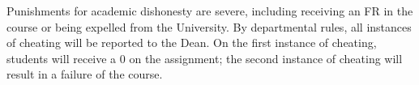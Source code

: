 \documentclass{article}
\begin{document}
Punishments for academic dishonesty are severe, including receiving an FR in the course or being expelled from the University. By departmental rules, all instances of cheating will be reported to the Dean. On the first instance of cheating, students will receive a 0 on the assignment; the second instance of cheating will result in a failure of the course. 
\end{document}
